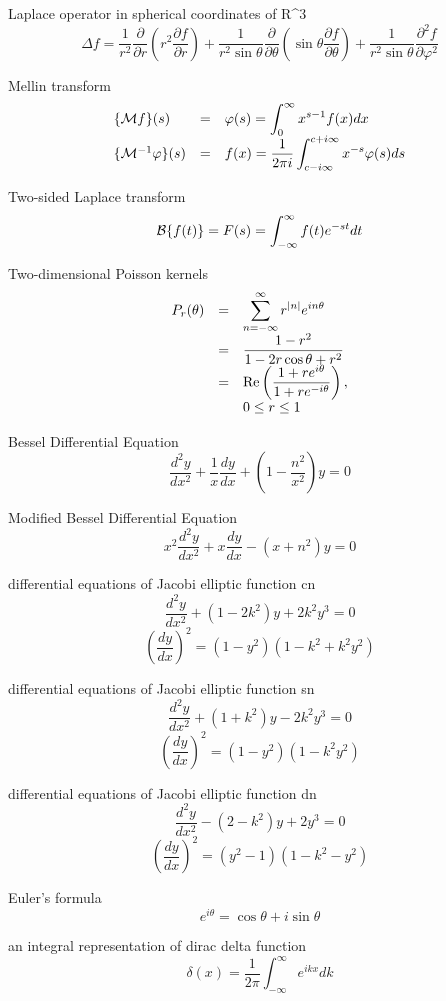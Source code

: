 Laplace operator in spherical coordinates of R^3
$$
\Delta f = \displaystyle \frac{1}{r^2}\frac{\partial}{\partial r}\left(r^2 \frac{\partial f}{\partial r} \right)+\frac{1}{r^2 \sin\theta}\frac{\partial}{\partial \theta}\left(\sin\theta \frac{\partial f}{\partial \theta} \right)+\frac{1}{r^2 \sin\theta}\frac{\partial^2 f}{\partial \varphi^2}
$$

Mellin transform
$$
\begin{array}{lll}
\{{\cal M}f\}(s)&=&\varphi(s)=\displaystyle \int^\infty_0 x^{s-1}f(x)dx \\
\{{\cal M}^{-1}\varphi\}(s)&=&f(x)=\displaystyle \frac{1}{2\pi i}\int^{c+i \infty}_{c-i\infty} x^{-s}\varphi(s)ds
\end{array}
$$


Two-sided Laplace transform 
$$
{\cal B} \{f(t)\}=F(s)=\displaystyle \int^\infty_{-\infty}f(t)e^{-st}dt
$$

Two-dimensional Poisson kernels
$$
\begin{array}{lll}
P_r(\theta)&=&\displaystyle \sum^\infty_{n=-\infty}r^{|n|}e^{in\theta} \\
&=& \displaystyle\frac{1-r^2}{1-2r\cos\theta+r^2} \\
&=& \displaystyle {\rm Re}\left(\frac{1+r e^{i\theta}}{1+r e^{-i\theta}}\right), \\
&&\displaystyle 0\le r\le 1
\end{array}
$$


Bessel Differential Equation
$$
\frac{d^2 y}{d x^2}+\frac{1}{x}\frac{d y}{d x}+\left(1-\frac{n^2}{x^2}\right)y=0
$$

Modified Bessel Differential Equation
$$
x^2 \frac{d^2 y}{d x^2}+x\frac{d y}{d x}-\left(x+n^2\right)y=0
$$

differential equations of Jacobi elliptic function cn 
$$
\frac{d^2 y}{d x^2}+(1-2k^2)y+2k^2y^3=0
$$
$$
\left(\frac{d y}{d x}\right)^2=(1-y^2)(1-k^2+k^2y^2)
$$

differential equations of Jacobi elliptic function sn
$$
\frac{d^2 y}{d x^2}+(1+k^2)y-2k^2y^3=0
$$
$$
\left(\frac{d y}{d x}\right)^2=(1-y^2)(1-k^2y^2)
$$

differential equations of Jacobi elliptic function dn
$$
\frac{d^2 y}{d x^2}-(2-k^2)y+2y^3=0
$$
$$
\left(\frac{d y}{d x}\right)^2=(y^2-1)(1-k^2-y^2)
$$

Euler's formula
$$
e^{i \theta}=\cos\theta+i\sin\theta
$$


an integral representation of dirac delta function
$$
\delta(x)=\displaystyle \frac{1}{2\pi}\int^\infty_{-\infty}e^{i k x}dk
$$


